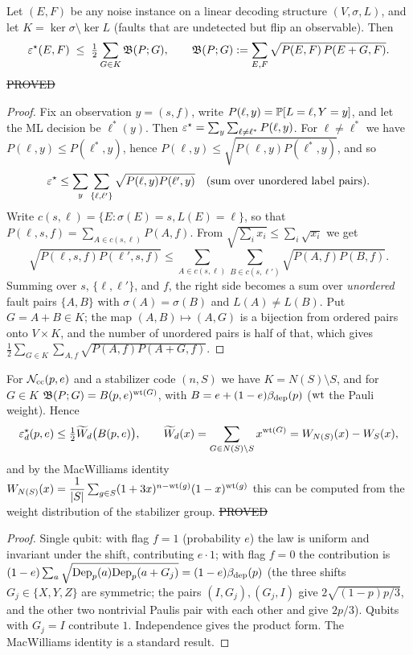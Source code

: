 \begin{lemma}\label{lem:union}
Let $(E,F)$ be any noise instance on a linear decoding structure $(V,\sigma,L)$, and let $K=\ker\sigma\setminus\ker L$
(faults that are undetected but flip an observable). Then
\[
\varepsilon^{\star}(E,F)\;\le\;\tfrac12\sum_{G\in K}\mathfrak{B}(P;G),\qquad
\mathfrak{B}(P;G):=\sum_{E,F}\sqrt{P(E,F)\,P(E+G,F)}.
\]
\hfill\st{PROVED}
\end{lemma}
\begin{proof}
Fix an observation $y=(s,f)$, write $P(\ell,y)=\mathbb{P}[L=\ell,Y=y]$, and let the ML decision be $\ell^\ast(y)$. Then
$\varepsilon^{\star}=\sum_y\sum_{\ell\ne\ell^\ast}P(\ell,y)$. For $\ell\ne\ell^\ast$ we have $P(\ell,y)\le P(\ell^\ast,y)$, hence
$P(\ell,y)\le\sqrt{P(\ell,y)P(\ell^\ast,y)}$, and so
\[
\varepsilon^{\star}\le\sum_y\sum_{\{\ell,\ell'\}}\sqrt{P(\ell,y)P(\ell',y)}\quad(\text{sum over unordered label pairs}).
\]
Write $c(s,\ell)=\{E:\sigma(E)=s,L(E)=\ell\}$, so that $P(\ell,s,f)=\sum_{A\in c(s,\ell)}P(A,f)$.
From $\sqrt{\sum_ix_i}\le\sum_i\sqrt{x_i}$ we get
\[
\sqrt{P(\ell,s,f)P(\ell',s,f)}\le\sum_{A\in c(s,\ell)}\sum_{B\in c(s,\ell')}\sqrt{P(A,f)P(B,f)}.
\]
Summing over $s$, $\{\ell,\ell'\}$, and $f$, the right side becomes a sum over \emph{unordered} fault pairs $\{A,B\}$ with $\sigma(A)=\sigma(B)$ and $L(A)\ne L(B)$.
Put $G=A+B\in K$; the map $(A,B)\mapsto(A,G)$ is a bijection from ordered pairs onto $V\times K$, and the number of unordered pairs is half of that,
which gives $\tfrac12\sum_{G\in K}\sum_{A,f}\sqrt{P(A,f)P(A+G,f)}$.
\end{proof}

\begin{corollary}\label{cor:product}
For $\mathcal{N}_{\rm cc}(p,e)$ and a stabilizer code $(n,S)$ we have $K=N(S)\setminus S$, and for $G\in K$
$\mathfrak{B}(P;G)=B(p,e)^{\operatorname{wt}(G)}$, with $B=e+(1-e)\beta_{\rm dep}(p)$ ($\operatorname{wt}$ the Pauli weight). Hence
\[
\varepsilon^{\star}_d(p,e)\le\tfrac12\widetilde W_d\big(B(p,e)\big),\qquad
\widetilde W_d(x)=\sum_{G\in N(S)\setminus S}x^{\operatorname{wt}(G)}=W_{N(S)}(x)-W_S(x),
\]
and by the MacWilliams identity $W_{N(S)}(x)=\dfrac1{|S|}\sum_{g\in S}(1+3x)^{n-\operatorname{wt}(g)}(1-x)^{\operatorname{wt}(g)}$ this can be computed from the weight distribution of the stabilizer group.
\hfill\st{PROVED}
\end{corollary}
\begin{proof}
Single qubit: with flag $f=1$ (probability $e$) the law is uniform and invariant under the shift, contributing $e\cdot1$; with flag $f=0$ the contribution is
$(1-e)\sum_a\sqrt{\mathrm{Dep}_p(a)\mathrm{Dep}_p(a+G_j)}=(1-e)\beta_{\rm dep}(p)$ (the three shifts $G_j\in\{X,Y,Z\}$ are symmetric;
the pairs $(I,G_j),(G_j,I)$ give $2\sqrt{(1-p)p/3}$, and the other two nontrivial Paulis pair with each other and give $2p/3$).
Qubits with $G_j=I$ contribute $1$. Independence gives the product form. The MacWilliams identity is a standard result.
\end{proof}

